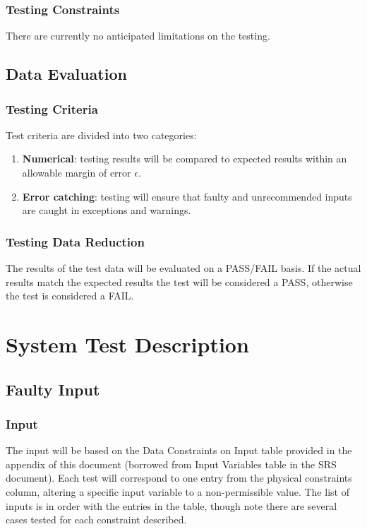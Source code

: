 \documentclass[12pt]{article}
\begin{document}
\subsubsection{ Testing Constraints}
There are currently no anticipated limitations on the testing.

\subsection{ Data Evaluation}

\subsubsection{ Testing Criteria}
Test criteria are divided into two categories:
\begin{enumerate}
\item \textbf{Numerical}: testing results will be compared to expected results
  within an allowable margin of error $\epsilon$.

\item \textbf{Error catching}: testing will ensure that faulty and unrecommended
  inputs are caught in exceptions and warnings.
\end{enumerate}

\subsubsection{ Testing Data Reduction}
The results of the test data will be evaluated on a PASS/FAIL basis. If the
actual results match the expected results the test will be considered a PASS,
otherwise the test is considered a FAIL.


%
%

\section{System Test Description}


\subsection{Faulty Input}

\subsubsection{ Input}
The input will be based on the Data Constraints on Input table provided in the
appendix of this document (borrowed from Input Variables table in the SRS
document). Each test will correspond to one entry from the physical constraints
column, altering a specific input variable to a non-permissible value. The list
of inputs is in order with the entries in the table, though note there are
several cases tested for each constraint described.
\end{document}
